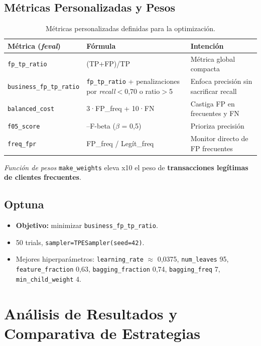 \documentclass[a4paper,12pt]{article}
\begin{document}
\subsection{Métricas Personalizadas y Pesos}
\begin{table}[h]
    \centering
    \begin{tabular}{l p{6cm} p{5cm}}
        \toprule
        \textbf{Métrica (\textit{feval})} & \textbf{Fórmula} & \textbf{Intención} \\
        \midrule
        \texttt{fp\_tp\_ratio} & (TP+FP)/TP & Métrica global compacta \\
        \texttt{business\_fp\_tp\_ratio} & \texttt{fp\_tp\_ratio} + penalizaciones por \textit{recall}$<$0,70 o ratio$>$5 & Enfoca precisión sin sacrificar recall \\
        \texttt{balanced\_cost} & 3·FP\_freq + 10·FN & Castiga FP en frecuentes y FN \\
        \texttt{f05\_score} & --F-beta ($\beta$ = 0,5) & Prioriza precisión \\
        \texttt{freq\_fpr} & FP\_freq / Legít\_freq & Monitor directo de FP frecuentes \\
        \bottomrule
    \end{tabular}
    \caption{Métricas personalizadas definidas para la optimización.}
    \label{tab:custom_metrics}
\end{table}
\textit{Función de pesos} \texttt{make\_weights} eleva x10 el peso de \textbf{transacciones legítimas de clientes frecuentes}.

\subsection{Optuna}
\begin{itemize}
    \item \textbf{Objetivo:} minimizar \texttt{business\_fp\_tp\_ratio}.
    \item 50 trials, \texttt{sampler=TPESampler(seed=42)}.
    \item Mejores hiperparámetros: \texttt{learning\_rate} $\approx$ 0,0375, \texttt{num\_leaves} 95, \texttt{feature\_fraction} 0,63, \texttt{bagging\_fraction} 0,74, \texttt{bagging\_freq} 7, \texttt{min\_child\_weight} 4.
\end{itemize}

\section{Análisis de Resultados y Comparativa de Estrategias}
\end{document}
